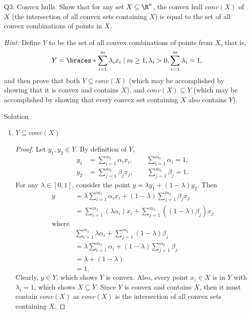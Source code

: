 \documentclass{article}
\theoremstyle{plain}
\theoremstyle{definition}
\theoremstyle{remark}
\begin{document}
\begin{problem}
    {Q3: Convex hulls.}
    Show that for any set $X\subseteq\R^n$, the convex hull $conv(X)$ of $X$ (the intersection of all convex sets containing $X$) is equal to the set of all convex combinations of points in $X$.

    \textit{Hint:} Define $Y$ to be the set of all convex combinations of points from $X$, that is,
    \[
        Y=\braces*{\sum_{i=1}^m\lambda_ix_i\mid m\geq1, \lambda_i>0,\sum_{i=1}^m\lambda_i=1},
    \]
    and then prove that both $Y\subseteq conv(X)$ (which may be accomplished by showing that it is convex and contains $X$), and $conv(X)\subseteq Y$ (which may be accomplished by showing that every convex set containing $X$ also contains $Y$).
\end{problem}

\begin{solution}
    {Solution}
    \begin{enumerate}
        \item $Y\subseteq conv(X)$ {
            \begin{proof}
                Let $y_1, y_2\in Y$. By definition of $Y$,
                \begin{align*}
                    y_1 &= \sum_{i=1}^{m_1}\alpha_ix_i, \qquad \sum_{i=1}^{m_1}\alpha_i=1,\\
                    y_2 &= \sum_{j=1}^{m_2}\beta_jx_j, \qquad \sum_{j=1}^{m_2}\beta_j=1.
                \end{align*}
                For any $\lambda\in[0,1]$, consider the point $y=\lambda y_1+(1-\lambda)y_2$. Then
                \begin{align*}
                    y&=\lambda\sum_{i=1}^{m_1}\alpha_ix_i+(1-\lambda)\sum_{j=1}^{m_2}\beta_jx_j\\
                    &=\sum_{i=1}^{m_1}(\lambda\alpha_i)x_i+\sum_{j=1}^{m_2}((1-\lambda)\beta_j)x_j\\
                    \text{where}\\
                    &\sum_{i=1}^{m_1}\lambda\alpha_i+\sum_{j=1}^{m_2}(1-\lambda)\beta_j\\
                    &=\lambda\sum_{i=1}^{m_1}\alpha_i+(1-\lambda)\sum_{j=1}^{m_2}\beta_j\\
                    &=\lambda+(1-\lambda)\\
                    &=1.
                \end{align*}
                Clearly, $y\in Y$, which shows $Y$ is convex. Also, every point $x_i\in X$ is in $Y$ with $\lambda_i=1$, which shows $X\subseteq Y$. Since $Y$ is convex and contains $X$, then it must contain $conv(X)$ as $conv(X)$ is the intersection of all convex sets containing $X$.

\end{proof}}
\end{enumerate}
\end{solution}
\end{document}
